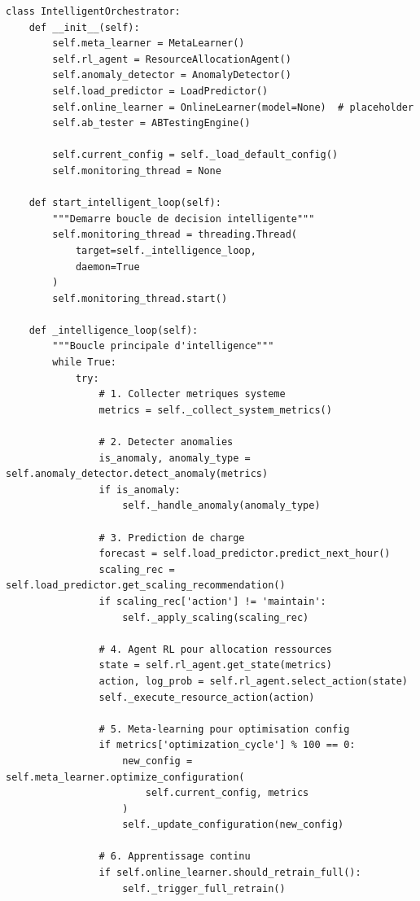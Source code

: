 \documentclass[12pt,a4paper]{article}
\begin{document}
\begin{lstlisting}[caption={Intelligent Orchestrator - Point Central}]
class IntelligentOrchestrator:
    def __init__(self):
        self.meta_learner = MetaLearner()
        self.rl_agent = ResourceAllocationAgent()
        self.anomaly_detector = AnomalyDetector()
        self.load_predictor = LoadPredictor()
        self.online_learner = OnlineLearner(model=None)  # placeholder
        self.ab_tester = ABTestingEngine()
        
        self.current_config = self._load_default_config()
        self.monitoring_thread = None
        
    def start_intelligent_loop(self):
        """Demarre boucle de decision intelligente"""
        self.monitoring_thread = threading.Thread(
            target=self._intelligence_loop,
            daemon=True
        )
        self.monitoring_thread.start()
        
    def _intelligence_loop(self):
        """Boucle principale d'intelligence"""
        while True:
            try:
                # 1. Collecter metriques systeme
                metrics = self._collect_system_metrics()
                
                # 2. Detecter anomalies
                is_anomaly, anomaly_type = self.anomaly_detector.detect_anomaly(metrics)
                if is_anomaly:
                    self._handle_anomaly(anomaly_type)
                    
                # 3. Prediction de charge
                forecast = self.load_predictor.predict_next_hour()
                scaling_rec = self.load_predictor.get_scaling_recommendation()
                if scaling_rec['action'] != 'maintain':
                    self._apply_scaling(scaling_rec)
                    
                # 4. Agent RL pour allocation ressources
                state = self.rl_agent.get_state(metrics)
                action, log_prob = self.rl_agent.select_action(state)
                self._execute_resource_action(action)
                
                # 5. Meta-learning pour optimisation config
                if metrics['optimization_cycle'] % 100 == 0:
                    new_config = self.meta_learner.optimize_configuration(
                        self.current_config, metrics
                    )
                    self._update_configuration(new_config)
                    
                # 6. Apprentissage continu
                if self.online_learner.should_retrain_full():
                    self._trigger_full_retrain()
                    

\end{lstlisting}
\end{document}
